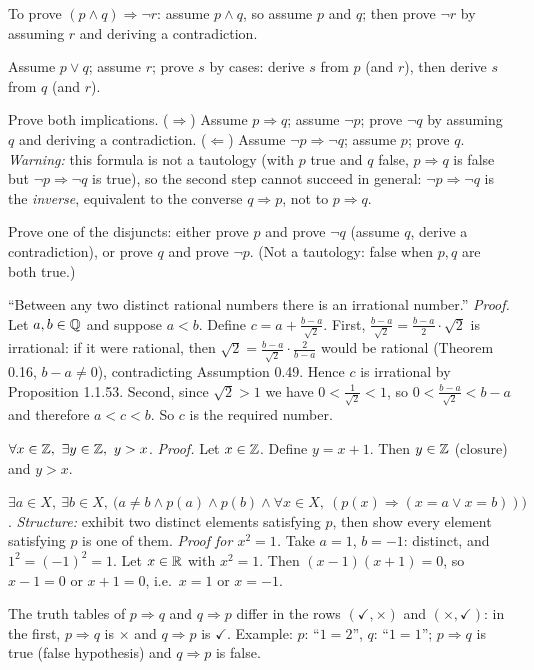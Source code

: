  To prove $(p\wedge q)\Rightarrow\neg r$: assume $p\wedge q$, so assume $p$ and $q$; then prove $\neg r$ by assuming $r$ and deriving a contradiction.

 Assume $p\vee q$; assume $r$; prove $s$ by cases: derive $s$ from $p$ (and $r$), then derive $s$ from $q$ (and $r$).

 Prove both implications. ($\Rightarrow$) Assume $p\Rightarrow q$; assume $\neg p$; prove $\neg q$ by assuming $q$ and deriving a contradiction. ($\Leftarrow$) Assume $\neg p\Rightarrow\neg q$; assume $p$; prove $q$. \emph{Warning:} this formula is not a tautology (with $p$ true and $q$ false, $p\Rightarrow q$ is false but $\neg p\Rightarrow\neg q$ is true), so the second step cannot succeed in general: $\neg p\Rightarrow\neg q$ is the \emph{inverse}, equivalent to the converse $q\Rightarrow p$, not to $p\Rightarrow q$.

 Prove one of the disjuncts: either prove $p$ and prove $\neg q$ (assume $q$, derive a contradiction), or prove $q$ and prove $\neg p$. (Not a tautology: false when $p,q$ are both true.)

 ``Between any two distinct rational numbers there is an irrational number.'' \emph{Proof.} Let $a,b\in\mathbb{Q}$ and suppose $a<b$. Define $c=a+\frac{b-a}{\sqrt2}$. First, $\frac{b-a}{\sqrt2}=\frac{b-a}2\cdot\sqrt2$ is irrational: if it were rational, then $\sqrt2=\frac{b-a}{\sqrt2}\cdot\frac2{b-a}$ would be rational (Theorem 0.16, $b-a\ne0$), contradicting Assumption 0.49. Hence $c$ is irrational by Proposition 1.1.53. Second, since $\sqrt2>1$ we have $0<\frac1{\sqrt2}<1$, so $0<\frac{b-a}{\sqrt2}<b-a$ and therefore $a<c<b$. So $c$ is the required number.

 $\forall x\in\Z,\ \exists y\in\Z,\ y>x$. \emph{Proof.} Let $x\in\mathbb{Z}$. Define $y=x+1$. Then $y\in\mathbb{Z}$ (closure) and $y>x$.

 $\exists a\in X,\ \exists b\in X,\ \big(a\ne b\wedge p(a)\wedge p(b)\wedge\forall x\in X,\ (p(x)\Rightarrow(x=a\vee x=b))\big)$. \emph{Structure:} exhibit two distinct elements satisfying $p$, then show every element satisfying $p$ is one of them. \emph{Proof for $x^2=1$.} Take $a=1$, $b=-1$: distinct, and $1^2=(-1)^2=1$. Let $x\in\mathbb{R}$ with $x^2=1$. Then $(x-1)(x+1)=0$, so $x-1=0$ or $x+1=0$, i.e.\ $x=1$ or $x=-1$.

 The truth tables of $p\Rightarrow q$ and $q\Rightarrow p$ differ in the rows $(\checkmark,\times)$ and $(\times,\checkmark)$: in the first, $p\Rightarrow q$ is $\times$ and $q\Rightarrow p$ is $\checkmark$. Example: $p$: ``$1=2$'', $q$: ``$1=1$''; $p\Rightarrow q$ is true (false hypothesis) and $q\Rightarrow p$ is false.

